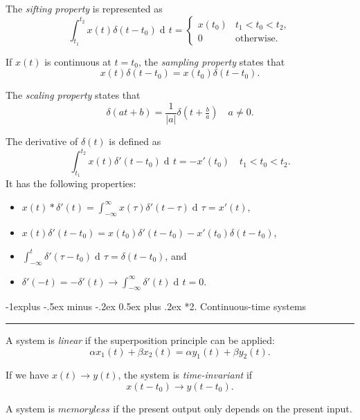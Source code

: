 \documentclass[10pt,letterpaper]{article}
\makeatletter
\DeclareMathOperator{\di}{d\!} %
\newcommand{\bracks}[1]{ \left( #1 \right) } %
\newcommand{\abs}[1]{\left| #1 \right|} %
\newcommand{\impulse}{ \delta(t) }
\newcommand{\dimpulse}{ \delta'(t) }
\newcommand{\Iint}{ \int_{-\infty}^{\infty} }
\newcommand{\tint}{ \int_{t_1}^{t_2} }
\newcommand{\underlineSection}[1][unnamed]{
\subsection*{#1}
\hrule
\vspace{12pt}
}
\renewcommand{\subsection}{\@startsection{subsection}{2}{0mm}%
                                {-1explus -.5ex minus -.2ex}%
                                {0.5ex plus .2ex}%
                                {\normalfont\normalsize\bfseries}}
\makeatother
\begin{document}
\begin{multicols*}{3}
The \textit{sifting property} is represented as
\[ \tint x(t)\delta(t-t_0) \di t = \begin{cases} 
      								x(t_0) & t_1 < t_0 < t_2, \\
      								0 & \text{otherwise}. 
   									\end{cases}
\]

If $x(t)$ is continuous at $t = t_0$, the \textit{sampling property} states that
\[ x(t)\delta(t-t_0) = x(t_0)\delta(t-t_0). \]

The \textit{scaling property} states that
\[ \delta(at + b) = \dfrac{1}{\abs{a}} \delta\bracks{t + \tfrac{b}{a}} \quad a \neq 0. \]

The derivative of $\impulse$ is defined as
\[ \tint x(t) \delta'(t-t_0) \di t = -x'(t_0) \quad t_1 < t_0 < t_2. \]
It has the following properties:
\begin{itemize}[leftmargin=0.5cm]
\item $\displaystyle x(t)*\dimpulse = \Iint x(\tau)\delta'(t-\tau) \di \tau = x'(t)$,
\item $x(t)\delta'(t-t_0) = x(t_0)\delta'(t-t_0) - x'(t_0)\delta(t-t_0)$,
\item $\displaystyle \int_{-\infty}^t \delta'(\tau - t_0) \di \tau = \delta(t-t_0)$, and
\item $\displaystyle \delta'(-t) = -\delta'(t) \rightarrow \Iint \dimpulse \di t = 0$.
\end{itemize}

\underlineSection[2. Continuous-time systems]
A system is \textit{linear} if the superposition principle can be applied:
\[ \alpha x_1(t) + \beta x_2(t) = \alpha y_1(t) + \beta y_2(t). \]

If we have $x(t) \rightarrow y(t)$, the system is \textit{time-invariant} if
\[ x(t-t_0) \rightarrow y(t-t_0). \]

A system is $memoryless$ if the present output only depends on the present input. 

\end{multicols*}
\end{document}
